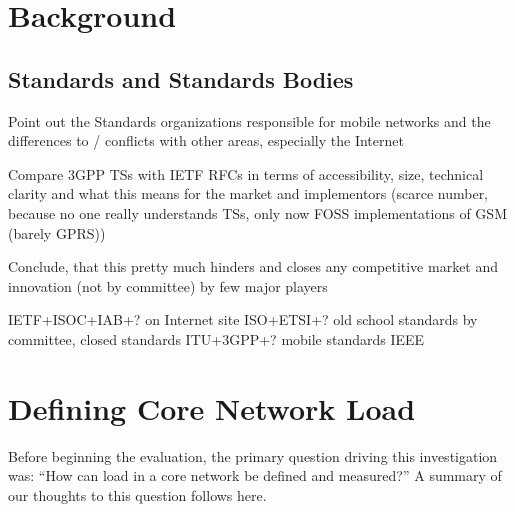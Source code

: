 \section{Background}

\subsection{Standards and Standards Bodies}

Point out the Standards organizations responsible for mobile networks and the differences to / conflicts with other areas, especially the Internet

Compare \ac{3GPP} \acp{TS} with \ac{IETF} \acp{RFC} in terms of accessibility, size, technical clarity and what this means for the market and implementors (scarce number, because no one really understands TSs, only now \ac{FOSS} implementations of \ac{GSM} (barely \ac{GPRS}))

Conclude, that this pretty much hinders and closes any competitive market and innovation (not by committee) by few major players

\ac{IETF}+\ac{ISOC}+\ac{IAB}+? on Internet site
\ac{ISO}+\ac{ETSI}+? old school standards by committee, closed standards
\ac{ITU}+\ac{3GPP}+? mobile standards
\ac{IEEE}














\section{Defining Core Network Load}
\label{c4:sec:loaddefinition}

Before beginning the evaluation, the primary question driving this investigation was: ``How can load in a core network be defined and measured?'' A summary of our thoughts to this question follows here.

